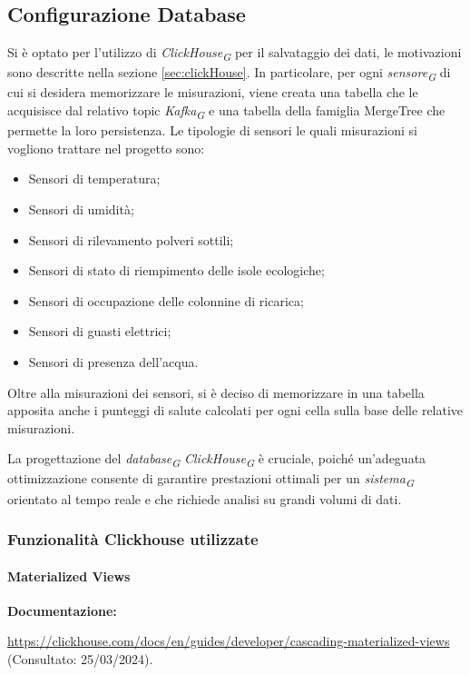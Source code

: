 \subsection{Configurazione Database}
Si è optato per l'utilizzo di \textit{ClickHouse}\textsubscript{\textit{G}} per il salvataggio dei dati, le motivazioni sono descritte nella sezione \ref{sec:clickHouse}. In particolare, per ogni \textit{sensore}\textsubscript{\textit{G}} di cui si desidera memorizzare le misurazioni, viene creata una tabella che le acquisisce dal relativo topic \textit{Kafka}\textsubscript{\textit{G}} e una tabella della famiglia MergeTree che permette la loro persistenza.
Le tipologie di sensori le quali misurazioni si vogliono trattare nel progetto sono:
\begin{itemize}
    \item Sensori di temperatura;
    \item Sensori di umidità;
    \item Sensori di rilevamento polveri sottili; 
    \item Sensori di stato di riempimento delle isole ecologiche;
    \item Sensori di occupazione delle colonnine di ricarica;
    \item Sensori di guasti elettrici;
    \item Sensori di presenza dell'acqua.
\end{itemize}
Oltre alla misurazioni dei sensori, si è deciso di memorizzare in una tabella apposita anche i punteggi di salute calcolati per ogni cella sulla base delle relative misurazioni.

La progettazione del \textit{database}\textsubscript{\textit{G}} \textit{ClickHouse}\textsubscript{\textit{G}} è cruciale, poiché un'adeguata ottimizzazione consente di garantire prestazioni ottimali per un \textit{sistema}\textsubscript{\textit{G}} orientato al tempo reale e che richiede analisi su grandi volumi di dati.

\subsubsection{Funzionalità Clickhouse utilizzate}
\paragraph{Materialized Views}
\textbf{Documentazione:}

\url{https://clickhouse.com/docs/en/guides/developer/cascading-materialized-views} (Consultato: 25/03/2024).

